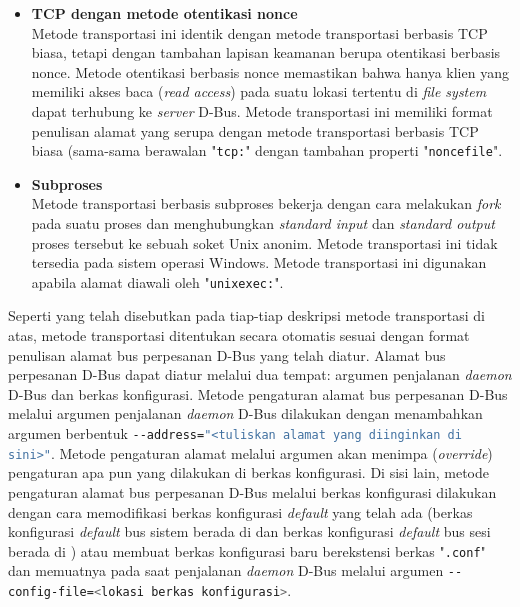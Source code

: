 \begin{itemize}
    \item \textbf{TCP dengan metode otentikasi nonce}\\
    Metode transportasi ini identik dengan metode transportasi berbasis TCP biasa, tetapi dengan tambahan lapisan keamanan berupa otentikasi berbasis nonce. Metode otentikasi berbasis nonce memastikan bahwa hanya klien yang memiliki akses baca (\textit{read access}) pada suatu lokasi tertentu di \textit{file system} dapat terhubung ke \textit{server} D-Bus. Metode transportasi ini memiliki format penulisan alamat yang serupa dengan metode transportasi berbasis TCP biasa (sama-sama berawalan "\verb|tcp:|" dengan tambahan properti "\verb|noncefile|".

    \item \textbf{Subproses}\\
    Metode transportasi berbasis subproses bekerja dengan cara melakukan \textit{fork} pada suatu proses dan menghubungkan \textit{standard input} dan \textit{standard output} proses tersebut ke sebuah soket Unix anonim. Metode transportasi ini tidak tersedia pada sistem operasi Windows. Metode transportasi ini digunakan apabila alamat diawali oleh "\verb|unixexec:|".
\end{itemize}

Seperti yang telah disebutkan pada tiap-tiap deskripsi metode transportasi di atas, metode transportasi ditentukan secara otomatis sesuai dengan format penulisan alamat bus perpesanan D-Bus yang telah diatur. Alamat bus perpesanan D-Bus dapat diatur melalui dua tempat: argumen penjalanan \textit{daemon} D-Bus dan berkas konfigurasi. Metode pengaturan alamat bus perpesanan D-Bus melalui argumen penjalanan \textit{daemon} D-Bus dilakukan dengan menambahkan argumen berbentuk \lstinline[language=bash,columns=fixed]{--address="<tuliskan alamat yang diinginkan di sini>"}. Metode pengaturan alamat melalui argumen akan menimpa (\textit{override}) pengaturan apa pun yang dilakukan di berkas konfigurasi. Di sisi lain, metode pengaturan alamat bus perpesanan D-Bus melalui berkas konfigurasi dilakukan dengan cara memodifikasi berkas konfigurasi \textit{default} yang telah ada (berkas konfigurasi \textit{default} bus sistem berada di  dan berkas konfigurasi \textit{default} bus sesi berada di ) atau membuat berkas konfigurasi baru berekstensi berkas "\verb|.conf|" dan memuatnya pada saat penjalanan \textit{daemon} D-Bus melalui argumen \lstinline[language=bash,columns=fixed]{--config-file=<lokasi berkas konfigurasi>}.

